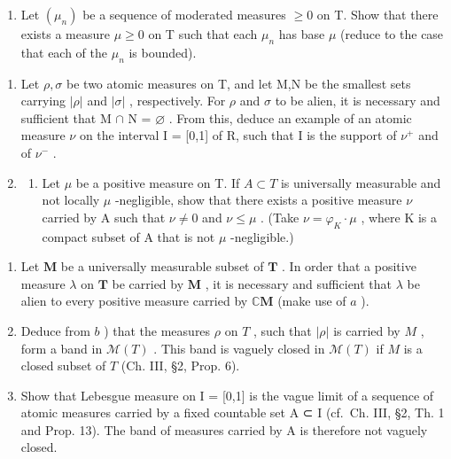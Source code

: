 \begin{enumerate}
\def\labelenumi{\alph{enumi})}
\setcounter{enumi}{1}
\tightlist
\item
  Let \((\mu_{n})\) be a sequence of moderated measures \(\geqslant0\) on T. Show that there exists a measure \(\mu\geqslant0\) on T such that each \(\mu_{n}\) has base \(\mu\) (reduce to the case that each of the \(\mu_{n}\) is bounded).
\end{enumerate}

\begin{enumerate}
\def\labelenumi{\arabic{enumi})}
\setcounter{enumi}{4}
\item
  Let \(\rho, \sigma\) be two atomic measures on T, and let M,N be the smallest sets carrying \(|\rho|\) and \(|\sigma|\) , respectively. For \(\rho\) and \(\sigma\) to be alien, it is necessary and sufficient that M \(\cap\) N = \(\varnothing\) . From this, deduce an example of an atomic measure \(\nu\) on the interval I = {[}0,1{]} of R, such that I is the support of \(\nu^{+}\) and of \(\nu^{-}\) .
\item
  \begin{enumerate}
  \def\labelenumii{\alph{enumii})}
  \tightlist
  \item
    Let \(\mu\) be a positive measure on T. If \(A \subset T\) is universally measurable and not locally \(\mu\) -negligible, show that there exists a positive measure \(\nu\) carried by A such that \(\nu \neq 0\) and \(\nu \leqslant \mu\) . (Take \(\nu = \varphi_{K} \cdot \mu\) , where K is a compact subset of A that is not \(\mu\) -negligible.)
  \end{enumerate}
\end{enumerate}

\begin{enumerate}
\def\labelenumi{\alph{enumi})}
\setcounter{enumi}{1}
\item
  Let \(\mathbf{M}\) be a universally measurable subset of \(\mathbf{T}\) . In order that a positive measure \(\lambda\) on \(\mathbf{T}\) be carried by \(\mathbf{M}\) , it is necessary and sufficient that \(\lambda\) be alien to every positive measure carried by \(\mathbb{C}\mathbf{M}\) (make use of \(a\) ).
\item
  Deduce from \(b\) ) that the measures \(\rho\) on \(T\) , such that \(|\rho|\) is carried by \(M\) , form a band in \(\mathcal{M}(T)\) . This band is vaguely closed in \(\mathcal{M}(T)\) if \(M\) is a closed subset of \(T\) (Ch. III, §2, Prop. 6).
\item
  Show that Lebesgue measure on I = {[}0,1{]} is the vague limit of a sequence of atomic measures carried by a fixed countable set A ⊂ I (cf.~Ch. III, §2, Th. 1 and Prop. 13). The band of measures carried by A is therefore not vaguely closed.
\end{enumerate}


